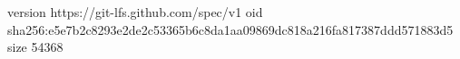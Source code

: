 version https://git-lfs.github.com/spec/v1
oid sha256:e5e7b2c8293e2de2c53365b6c8da1aa09869dc818a216fa817387ddd571883d5
size 54368
